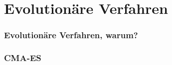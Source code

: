 \section{Evolutionäre Verfahren}
\lipsum[1-2]
%
\subsubsection{Evolutionäre Verfahren, warum?}
\lipsum[1]
%
%
\subsubsection{CMA-ES}
\lipsum[1]